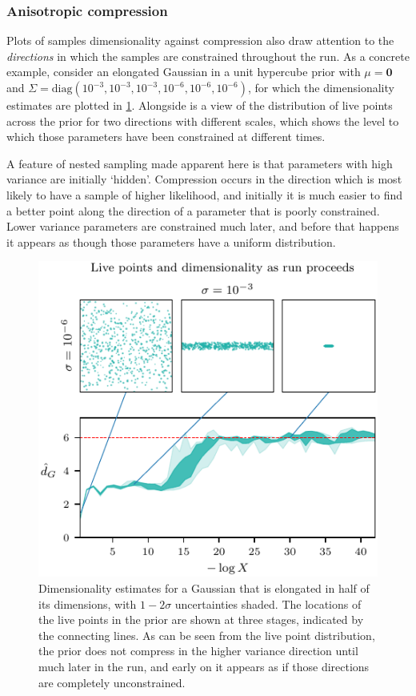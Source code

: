 \documentclass[usenatbib]{mnras}
\begin{document}
\subsubsection*{Anisotropic compression}\label{sec:elongated}
Plots of samples dimensionality against compression also draw attention to the \textit{directions} in which the samples are constrained throughout the run. As a concrete example, consider an elongated Gaussian in a unit hypercube prior with $\mu = \bm{0}$ and $\Sigma = \mathrm{diag}\left(10^{-3}, 10^{-3}, 10^{-3}, 10^{-6}, 10^{-6}, 10^{-6}\right)$, for which the dimensionality estimates are plotted in \cref{fig:d_G_elongated}. Alongside is a view of the distribution of live points across the prior for two directions with different scales, which shows the level to which those parameters have been constrained at different times.
\par
A feature of nested sampling made apparent here is that parameters with high variance are initially `hidden'. Compression occurs in the direction which is most likely to have a sample of higher likelihood, and initially it is much easier to find a better point along the direction of a parameter that is poorly constrained. Lower variance parameters are constrained much later, and before that happens it appears as though those parameters have a uniform distribution.
\begin{figure}
\begin{center}
    \includegraphics{figures/d_G_elongated.pdf}
\end{center}
\caption{Dimensionality estimates for a Gaussian that is elongated in half of its dimensions, with $1-2\sigma$ uncertainties shaded. The locations of the live points in the prior are shown at three stages, indicated by the connecting lines. As can be seen from the live point distribution, the prior does not compress in the higher variance direction until much later in the run, and early on it appears as if those directions are completely unconstrained.}
\label{fig:d_G_elongated}
\end{figure}
\end{document}
